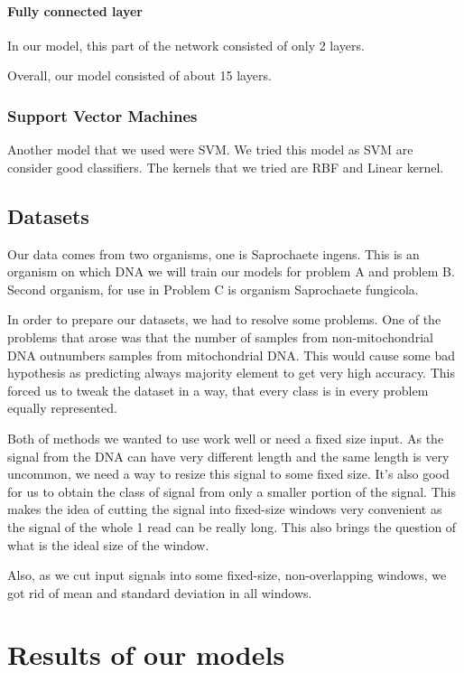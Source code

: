 \paragraph{Fully connected layer}

In our model, this part of the network consisted of only 2 layers.

\medskip

Overall, our model consisted of about 15 layers.

\subsubsection{Support Vector Machines}

Another model that we used were SVM. We tried this model as SVM are consider good
classifiers. The kernels that we tried are RBF and Linear kernel.

\subsection{Datasets}

Our data comes from two organisms, one is Saprochaete ingens. This is an organism
on which DNA we will train our models for problem A and problem B. Second organism,
for use in Problem C is organism Saprochaete fungicola.

In order to prepare our datasets, we had to resolve some problems. One of the
problems that arose was that the number of samples from non-mitochondrial DNA
outnumbers samples from mitochondrial DNA. This would cause some bad hypothesis
as predicting always majority element to get very high accuracy. This forced us
to tweak the dataset in a way, that every class is in every problem equally represented.

Both of methods we wanted to use work well or need a fixed size input. As the signal
from the DNA can have very different length and the same length is very uncommon, we
need a way to resize this signal to some fixed size. It’s also good for us to obtain
the class of signal from only a smaller portion of the signal. This makes the idea
of cutting the signal into fixed-size windows very convenient as the signal of the
whole 1 read can be really long. This also brings the question of what is the ideal
size of the window.

Also, as we cut input signals into some fixed-size, non-overlapping windows, we got
rid of mean and standard deviation in all windows.

\section{Results of our models}

